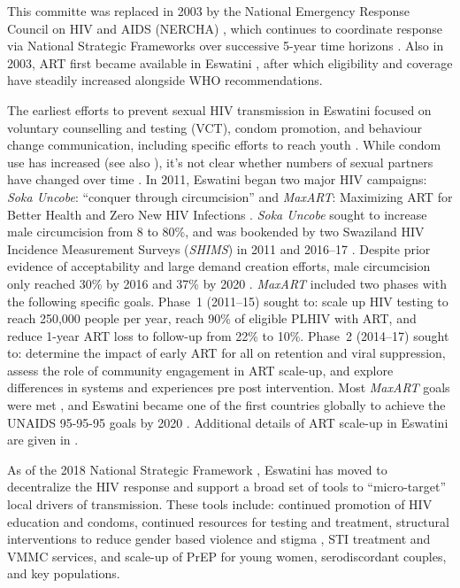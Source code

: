 This committe was replaced in 2003 by
the National Emergency Response Council on HIV and AIDS (NERCHA) \cite{Mabuza2017},
which continues to coordinate response via National Strategic Frameworks
over successive 5-year time horizons \cite{NERCHA2009,NERCHA2014,NERCHA2018}.
Also in 2003, ART first became available in Eswatini \cite{NERCHA2012},
after which eligibility and coverage have steadily increased alongside WHO recommendations.
\par
The earliest efforts to prevent sexual HIV transmission in Eswatini focused on
voluntary counselling and testing (VCT), condom promotion, and behaviour change communication,
including specific efforts to reach youth \cite{NERCHA2007}.
While condom use has increased (see also ),
it's not clear whether numbers of sexual partners have changed over time \cite{Cockcroft2010}.
In 2011, Eswatini began two major HIV campaigns:
\emph{Soka Uncobe}: ``conquer through circumcision'' \cite{SHIMS1} and
\emph{MaxART}: Maximizing ART for Better Health and Zero New HIV Infections \cite{MaxART1,MaxART2}.
\emph{Soka Uncobe} sought to increase male circumcision from 8 to 80\%,
and was bookended by two Swaziland HIV Incidence Measurement Surveys (\emph{SHIMS})
in 2011 \cite{SHIMS1} and 2016--17 \cite{SHIMS2}.
Despite prior evidence of acceptability and large demand creation efforts,
male circumcision only reached 30\% by 2016 \cite{SHIMS2} and 37\% by 2020 \cite{EswCOP21}.
\emph{MaxART} included two phases with the following specific goals.
Phase~1 (2011--15) sought to:
scale up HIV testing to reach 250,000 people per year,
reach 90\% of eligible PLHIV with ART, and
reduce 1-year ART loss to follow-up from 22\% to 10\%.
Phase~2 (2014--17) sought to:
determine the impact of early ART for all on retention and viral suppression,
assess the role of community engagement in ART scale-up, and
explore differences in systems and experiences pre \vs post intervention.
Most \emph{MaxART} goals were met \cite{MaxART2,Walsh2020},
and Eswatini became one of the first countries globally to
achieve the UNAIDS 95-95-95 goals by 2020 \cite{959595,AIDSinfo}.
Additional details of ART scale-up in Eswatini are given in .
\par
As of the 2018 National Strategic Framework \cite{NERCHA2018},
Eswatini has moved to decentralize the HIV response
and support a broad set of tools to ``micro-target'' local drivers of transmission.
These tools include:
continued promotion of HIV education and condoms,
continued resources for testing and treatment,
structural interventions to reduce gender based violence and stigma \cite{Saul2018},
STI treatment and VMMC services, and
scale-up of PrEP for young women, serodiscordant couples, and key populations.
